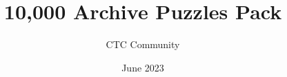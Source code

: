 \documentclass[a4paper,12pt,oneside]{book}
\begin{document}
\author{CTC Community}
\title{10,000 Archive Puzzles Pack}
\date{June 2023}

\frontmatter


\tableofcontents

\mainmatter
\setlength{\parindent}{0em}







\backmatter
\end{document}
